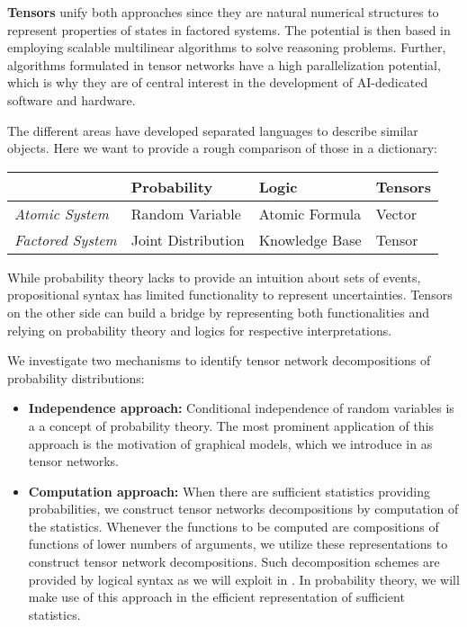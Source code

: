 \textbf{Tensors} unify both approaches since they are natural numerical structures to represent properties of states in factored systems.
The potential is then based in employing scalable multilinear algorithms to solve reasoning problems.
Further, algorithms formulated in tensor networks have a high parallelization potential, which is why they are of central interest in the development of AI-dedicated software and hardware.

The different areas have developed separated languages to describe similar objects.
Here we want to provide a rough comparison of those in a dictionary:

\begin{tabular}{|p{\fourcolumnwidth}|p{\fourcolumnwidth}|p{\fourcolumnwidth}|p{\fourcolumnwidth}|} %
    \hline
    & \textbf{Probability} & \textbf{Logic} & \textbf{Tensors}   \\
    \hline
    \textit{Atomic System}        & Random Variable             & Atomic Formula               & Vector             \\
    \textit{Factored System}      & Joint Distribution          & Knowledge Base               & Tensor             \\
    \hline
\end{tabular}

While probability theory lacks to provide an intuition about sets of events, propositional syntax has limited functionality to represent uncertainties.
Tensors on the other side can build a bridge by representing both functionalities and relying on probability theory and logics for respective interpretations.


We investigate two mechanisms to identify tensor network decompositions of probability distributions:
\begin{itemize}
    \item \textbf{Independence approach:} Conditional independence of random variables is a a concept of probability theory.
       The most prominent application of this approach is the motivation of graphical models, which we introduce in  as tensor networks.
    \item \textbf{Computation approach:} When there are sufficient statistics providing probabilities, we construct tensor networks decompositions by computation of the statistics.
        Whenever the functions to be computed are compositions of functions of lower numbers of arguments, we utilize these representations to construct tensor network decompositions.
        Such decomposition schemes are provided by logical syntax as we will exploit in .
        In probability theory, we will make use of this approach in the efficient representation of sufficient statistics.
\end{itemize}
